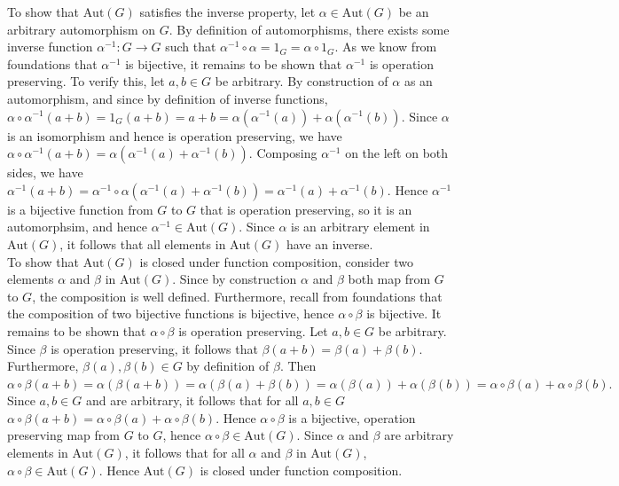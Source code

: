 \documentclass{article}
\newcommand{\Aut}{\mbox{Aut}}
\begin{document}
To show that $\Aut(G)$ satisfies the inverse property, let $\alpha\in \Aut(G)$ be an arbitrary automorphism on $G$. By definition of automorphisms, there exists some inverse function $\alpha^{-1}:G\rightarrow G$ such that $\alpha^{-1}\circ \alpha = 1_G = \alpha\circ 1_G$. As we know from foundations that $\alpha^{-1}$ is bijective, it remains to be shown that $\alpha^{-1}$ is operation preserving. To verify this, let $a,b\in G$ be arbitrary. By construction of $\alpha$ as an automorphism, and since by definition of inverse functions, $\alpha\circ \alpha^{-1}(a+b) = 1_G(a+b) = a+b = \alpha(\alpha^{-1}(a)) + \alpha(\alpha^{-1}(b)).$ Since $\alpha$ is an isomorphism and hence is operation preserving, we have $\alpha\circ\alpha^{-1}(a+ b) = \alpha(\alpha^{-1}(a) + \alpha^{-1}(b)).$ Composing $\alpha^{-1}$ on the left on both sides, we have $\alpha^{-1}(a+b) = \alpha^{-1}\circ \alpha(\alpha^{-1}(a) + \alpha^{-1}(b)) = \alpha^{-1}(a) + \alpha^{-1}(b)$. Hence $\alpha^{-1}$ is a bijective function from $G$ to $G$ that is operation preserving, so it is an automorphsim, and hence $\alpha^{-1}\in \Aut(G)$. Since $\alpha$ is an arbitrary element in $\Aut(G)$, it follows that all elements in $\Aut(G)$ have an inverse.\\

To show that $\Aut(G)$ is closed under function composition, consider two elements $\alpha$ and $\beta$ in $\Aut(G)$. Since by construction $\alpha$ and $\beta$ both map from $G$ to $G$, the composition is well defined. Furthermore, recall from foundations that the composition of two bijective functions is bijective, hence $\alpha\circ\beta$ is bijective. It remains to be shown that $\alpha\circ\beta$ is operation preserving. Let $a, b\in G$ be arbitrary. Since $\beta$ is operation preserving, it follows that $\beta(a+b) = \beta(a)+\beta(b)$. Furthermore, $\beta(a),\beta(b)\in G$ by definition of $\beta$. Then $\alpha\circ\beta(a+b) = \alpha(\beta(a+b)) = \alpha(\beta(a) + \beta(b)) = \alpha(\beta(a)) + \alpha(\beta(b)) = \alpha\circ\beta(a) +\alpha\circ\beta(b).$ Since $a,b\in G$ and are arbitrary, it follows that for all $a,b\in G$ $\alpha\circ \beta(a+b) = \alpha\circ\beta(a) + \alpha\circ\beta(b)$. Hence $\alpha\circ\beta$ is a bijective, operation preserving map from $G$ to $G$, hence $\alpha\circ\beta\in \Aut(G)$. Since $\alpha$ and $\beta$ are arbitrary elements in $\Aut(G)$, it follows that for all $\alpha$ and $\beta$ in $\Aut(G)$, $\alpha\circ \beta\in \Aut(G)$. Hence $\Aut(G)$ is closed under function composition.\\
\end{document}
